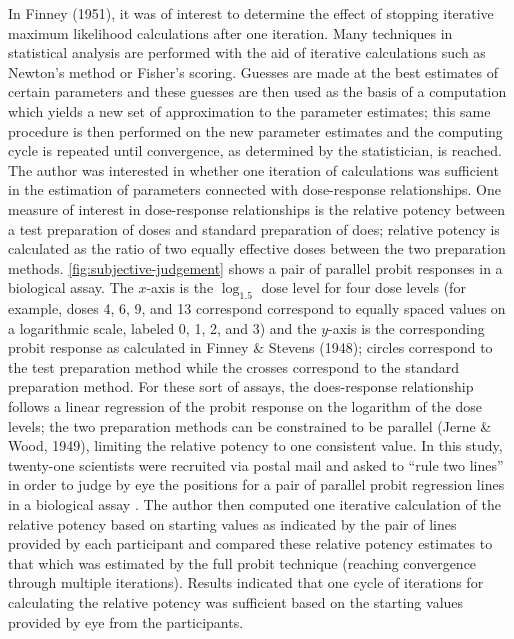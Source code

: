 \documentclass[print]{nuthesis}
\begin{document}

In Finney (1951), it was of interest to determine the effect of stopping iterative maximum likelihood calculations after one iteration.
Many techniques in statistical analysis are performed with the aid of iterative calculations such as Newton's method or Fisher's scoring.
Guesses are made at the best estimates of certain parameters and these guesses are then used as the basis of a computation which yields a new set of approximation to the parameter estimates; this same procedure is then performed on the new parameter estimates and the computing cycle is repeated until convergence, as determined by the statistician, is reached.
The author was interested in whether one iteration of calculations was sufficient in the estimation of parameters connected with dose-response relationships.
One measure of interest in dose-response relationships is the relative potency between a test preparation of doses and standard preparation of does; relative potency is calculated as the ratio of two equally effective doses between the two preparation methods.
\cref{fig:subjective-judgement} shows a pair of parallel probit responses in a biological assay.
The \(x\)-axis is the \(\log_{1.5}\) dose level for four dose levels (for example, doses 4, 6, 9, and 13 correspond correspond to equally spaced values on a logarithmic scale, labeled 0, 1, 2, and 3) and the \(y\)-axis is the corresponding probit response as calculated in Finney \& Stevens (1948); circles correspond to the test preparation method while the crosses correspond to the standard preparation method.
For these sort of assays, the does-response relationship follows a linear regression of the probit response on the logarithm of the dose levels; the two preparation methods can be constrained to be parallel (Jerne \& Wood, 1949), limiting the relative potency to one consistent value.
In this study, twenty-one scientists were recruited via postal mail and asked to ``rule two lines'' in order to judge by eye the positions for a pair of parallel probit regression lines in a biological assay .
The author then computed one iterative calculation of the relative potency based on starting values as indicated by the pair of lines provided by each participant and compared these relative potency estimates to that which was estimated by the full probit technique (reaching convergence through multiple iterations).
Results indicated that one cycle of iterations for calculating the relative potency was sufficient based on the starting values provided by eye from the participants.
\end{document}
